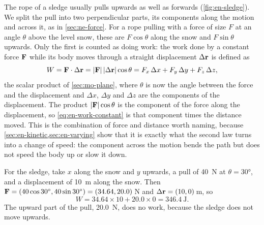 The rope of a sledge usually pulls upwards as well as forwards
(\cref{fig:en-sledge}). We split the pull into two perpendicular parts,
its components along the motion and across it, as in \cref{sec:ne-force}.
For a rope pulling with a force of size $F$ at an angle $\theta$ above the
level snow, these are $F\cos\theta$ along the snow and $F\sin\theta$
upwards. Only the first is counted as doing work: the work done by a
constant force $\bm{\mathrm{F}}$ while its body moves through a straight
displacement $\Delta\bm{\mathrm{r}}$ is defined as
\begin{equation}
   W = \bm{\mathrm{F}}\cdot\Delta\bm{\mathrm{r}}
   = \lvert\bm{\mathrm{F}}\rvert\,\lvert\Delta\bm{\mathrm{r}}\rvert\cos\theta
   = F_x\,\Delta x + F_y\,\Delta y + F_z\,\Delta z ,
   \label{eq:en-work-constant}
\end{equation}
the scalar product of \cref{sec:mo-plane}, where $\theta$ is now the angle
between the force and the displacement and $\Delta x$, $\Delta y$ and
$\Delta z$ are the components of the displacement. The product $\lvert
\bm{\mathrm{F}}\rvert\cos\theta$ is the component of the force along the
displacement, so \cref{eq:en-work-constant} is that component times the
distance moved. This is the combination of force and distance worth
naming, because \cref{sec:en-kinetic,sec:en-varying} show that it is exactly what the
second law turns into a change of speed: the
component across the motion bends the path but does not speed the body
up or slow it down.

For the sledge, take $x$ along the snow and $y$ upwards, a pull of
\SI{40}{\newton} at $\theta = \ang{30}$, and a displacement of
\SI{10}{\metre} along the snow. Then $\bm{\mathrm{F}} = (40\cos\ang{30},
40\sin\ang{30}) = (34.64, 20.0)$\,\si{\newton} and $\Delta\bm{\mathrm{r}} = (10,
0)$\,\si{\metre}, so
\begin{equation*}
   W = 34.64\times10 + 20.0\times0 = \SI{346.4}{\joule} .
\end{equation*}
The upward part of the pull, \SI{20.0}{\newton}, does no work, because
the sledge does not move upwards.

